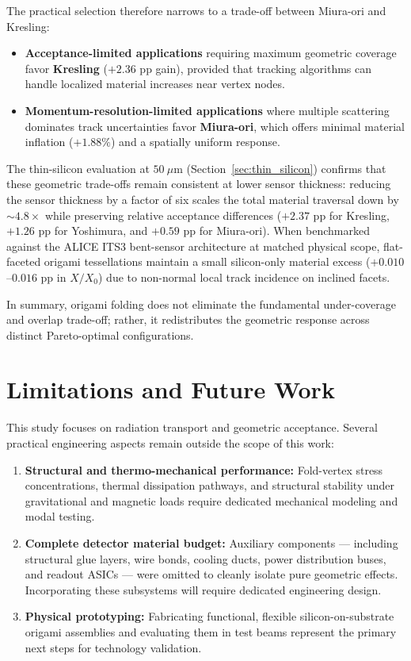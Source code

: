 \documentclass[a4paper,11pt]{article}
\begin{document}
The practical selection therefore narrows to a trade-off between Miura-ori and Kresling:
\begin{itemize}
    \item \textbf{Acceptance-limited applications} requiring maximum geometric coverage favor \textbf{Kresling} ($+2.36$ pp gain), provided that tracking algorithms can handle localized material increases near vertex nodes.
    \item \textbf{Momentum-resolution-limited applications} where multiple scattering dominates track uncertainties favor \textbf{Miura-ori}, which offers minimal material inflation ($+1.88\%$) and a spatially uniform response.
\end{itemize}

The thin-silicon evaluation at $50\ \mu\text{m}$ (Section~\ref{sec:thin_silicon}) confirms that these geometric trade-offs remain consistent at lower sensor thickness: reducing the sensor thickness by a factor of six scales the total material traversal down by $\sim 4.8\times$ while preserving relative acceptance differences ($+2.37$ pp for Kresling, $+1.26$ pp for Yoshimura, and $+0.59$ pp for Miura-ori). When benchmarked against the ALICE ITS3 bent-sensor architecture at matched physical scope, flat-faceted origami tessellations maintain a small silicon-only material excess ($+0.010$--$0.016$ pp in $X/X_0$) due to non-normal local track incidence on inclined facets.

In summary, origami folding does not eliminate the fundamental under-coverage and overlap trade-off; rather, it redistributes the geometric response across distinct Pareto-optimal configurations.

\section{Limitations and Future Work}
\label{sec:limitations}

This study focuses on radiation transport and geometric acceptance. Several practical engineering aspects remain outside the scope of this work:
\begin{enumerate}
    \item \textbf{Structural and thermo-mechanical performance:} Fold-vertex stress concentrations, thermal dissipation pathways, and structural stability under gravitational and magnetic loads require dedicated mechanical modeling and modal testing.
    \item \textbf{Complete detector material budget:} Auxiliary components --- including structural glue layers, wire bonds, cooling ducts, power distribution buses, and readout ASICs --- were omitted to cleanly isolate pure geometric effects. Incorporating these subsystems will require dedicated engineering design.
    \item \textbf{Physical prototyping:} Fabricating functional, flexible silicon-on-substrate origami assemblies and evaluating them in test beams represent the primary next steps for technology validation.
\end{enumerate}
\end{document}
